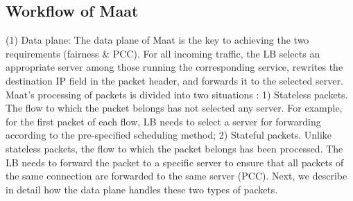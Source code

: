 \subsection{Workflow of Maat}
(1) Data plane: The data plane of Maat is the key to achieving the two requirements (fairness \& PCC). For all incoming traffic, the LB selects an appropriate server among those running the corresponding service, rewrites the destination IP field in the packet header, and forwards it to the selected server. Maat's processing of packets is divided into two situations \cite{shi2020concury}: 1) Stateless packets. The flow to which the packet belongs has not selected any server. For example, for the first packet of each flow, LB needs to select a server for forwarding according to the pre-specified scheduling method; 2) Stateful packets. Unlike stateless packets, the flow to which the packet belongs has been processed. The LB needs to forward the packet to a specific server to ensure that all packets of the same connection are forwarded to the same server (PCC). Next, we describe in detail how the data plane handles these two types of packets.

